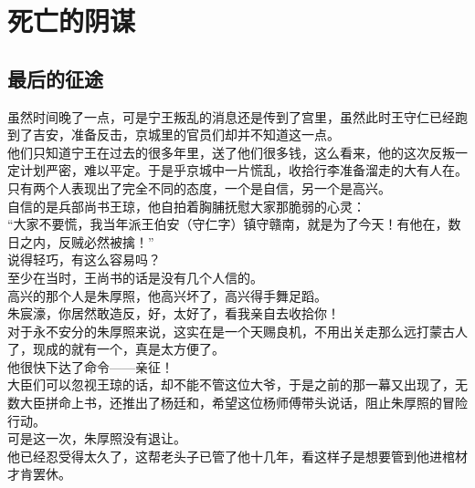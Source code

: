 \section{死亡的阴谋}
\ifnum{}
	\begin{multicols}{\theparacolNo}
\fi
\subsection{最后的征途}
虽然时间晚了一点，可是宁王叛乱的消息还是传到了宫里，虽然此时王守仁已经跑到了吉安，准备反击，京城里的官员们却并不知道这一点。\\

他们只知道宁王在过去的很多年里，送了他们很多钱，这么看来，他的这次反叛一定计划严密，难以平定。于是乎京城中一片慌乱，收拾行李准备溜走的大有人在。\\

只有两个人表现出了完全不同的态度，一个是自信，另一个是高兴。\\

自信的是兵部尚书王琼，他自拍着胸脯抚慰大家那脆弱的心灵：\\

“大家不要慌，我当年派王伯安（守仁字）镇守赣南，就是为了今天！有他在，数日之内，反贼必然被擒！”\\

说得轻巧，有这么容易吗？\\

至少在当时，王尚书的话是没有几个人信的。\\

高兴的那个人是朱厚照，他高兴坏了，高兴得手舞足蹈。\\

朱宸濠，你居然敢造反，好，太好了，看我亲自去收拾你！\\

对于永不安分的朱厚照来说，这实在是一个天赐良机，不用出关走那么远打蒙古人了，现成的就有一个，真是太方便了。\\

他很快下达了命令——亲征！\\

大臣们可以忽视王琼的话，却不能不管这位大爷，于是之前的那一幕又出现了，无数大臣拼命上书，还推出了杨廷和，希望这位杨师傅带头说话，阻止朱厚照的冒险行动。\\

可是这一次，朱厚照没有退让。\\

他已经忍受得太久了，这帮老头子已管了他十几年，看这样子是想要管到他进棺材才肯罢休。\\


\end{multicols}
